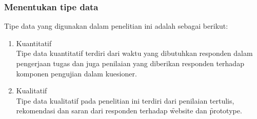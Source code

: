 \subsubsection{Menentukan tipe data}
Tipe data yang digunakan dalam penelitian ini adalah sebagai berikut:
\begin{enumerate}
	\item Kuantitatif\\
	Tipe data kuantitatif terdiri dari waktu yang dibutuhkan responden dalam pengerjaan tugas dan juga penilaian yang diberikan responden terhadap komponen pengujian dalam kuesioner.
	\item Kualitatif\\
	Tipe data kualitatif pada penelitian ini terdiri dari penilaian tertulis, rekomendasi dan saran dari responden terhadap \f{website} dan \f{prototype}.
\end{enumerate}
